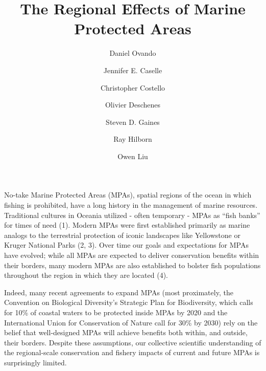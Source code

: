 \documentclass[9pt,twocolumn,twoside,lineno]{pnas-new}
\title{The Regional Effects of Marine Protected Areas}
\author[a,1]{Daniel Ovando}
\author[b]{Jennifer E. Caselle}
\author[b]{Christopher Costello}
\author[b]{Olivier Deschenes}
\author[b]{Steven D. Gaines}
\author[a]{Ray Hilborn}
\author[b]{Owen Liu}
\affil[a]{University of Washington, School of Aquatic and Fishery Sciences}
\affil[b]{University of California, Santa Barbara}
\begin{document}
\verticaladjustment{-2pt}

\maketitle
\thispagestyle{firststyle}




No-take Marine Protected Areas (MPAs), spatial regions of the ocean in
which fishing is prohibited, have a long history in the management of
marine resources. Traditional cultures in Oceania utilized - often
temporary - MPAs as ``fish banks'' for times of need (1). Modern MPAs
were first established primarily as marine analogs to the terrestrial
protection of iconic landscapes like Yellowstone or Kruger National
Parks (2, 3). Over time our goals and expectations for MPAs have
evolved; while all MPAs are expected to deliver conservation benefits
within their borders, many modern MPAs are also established to bolster
fish populations throughout the region in which they are located (4).

Indeed, many recent agreements to expand MPAs (most proximately, the
Convention on Biological Diversity's Strategic Plan for Biodiversity,
which calls for 10\% of coastal waters to be protected inside MPAs by
2020 and the International Union for Conservation of Nature call for
30\% by 2030) rely on the belief that well-designed MPAs will achieve
benefits both within, and outside, their borders. Despite these
assumptions, our collective scientific understanding of the
regional-scale conservation and fishery impacts of current and future
MPAs is surprisingly limited.
\end{document}

